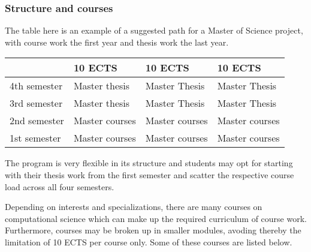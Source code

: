 \documentclass{beamer}
\begin{document}
\begin{frame}
\frametitle{Structure and courses}

\begin{block}{}
The table here is an example of a suggested path for a Master of Science project,
with course work the first year and thesis work the last year.


{\footnotesize
\begin{tabular}{llll}
\hline
\multicolumn{1}{l}{  } & \multicolumn{1}{l}{ 10 ECTS } & \multicolumn{1}{l}{ 10 ECTS } & \multicolumn{1}{l}{ 10 ECTS } \\
\hline
4th semester & Master thesis  & Master Thesis  & Master Thesis  \\
\hline
3rd semester & Master thesis  & Master Thesis  & Master Thesis  \\
\hline
2nd semester & Master courses & Master courses & Master courses \\
\hline
1st semester & Master courses & Master courses & Master courses \\
\hline
\end{tabular}
}

\noindent
The program is very flexible in its structure and students may opt for starting with their thesis
work from the first semester and scatter the respective course load across all four semesters.

Depending on interests and specializations, there are many courses on computational science which can make
up the required curriculum of course work. Furthermore, courses may be broken up in smaller modules,
avoding thereby the limitation of 10 ECTS per course only. Some of these courses are listed below.
\end{block}
\end{frame}
\end{document}
